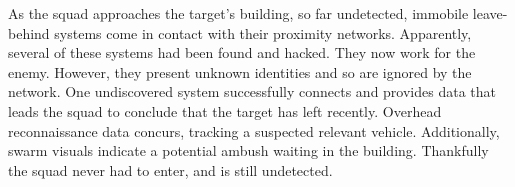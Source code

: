 %
%
%

As the squad approaches the target's building, so far undetected, immobile leave-behind systems come in contact with their proximity networks.
Apparently, several of these systems had been found and hacked.
They now work for the enemy.
However, they present unknown identities and so are ignored by the network.
One undiscovered system successfully connects and provides data that leads the squad to conclude that the target has left recently.
Overhead reconnaissance data concurs, tracking a suspected relevant vehicle.
Additionally, swarm visuals indicate a potential ambush waiting in the building.
Thankfully the squad never had to enter, and is still undetected.
